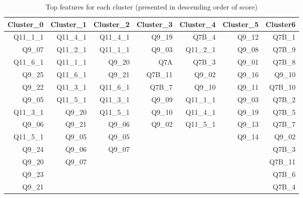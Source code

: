 \documentclass{article}
\begin{document}
\begin{table}[htbp]
  \centering
  \caption{Top features for each cluster (presented in descending order of
  score)}
    \begin{tabular}{rrrrrrr}
    \toprule
    Cluster\_0 & Cluster\_1 & Cluster\_2 & Cluster\_3 & Cluster\_4 & Cluster\_5 & Cluster6 \\
    \midrule
    Q11\_1\_1 & Q11\_4\_1 & Q11\_4\_1 & Q9\_19 & Q7B\_4 & Q9\_12 & Q7B\_1 \\
    Q9\_07 & Q11\_2\_1 & Q11\_1\_1 & Q9\_03 & Q11\_2\_1 & Q9\_08 & Q7B\_9 \\
    Q11\_6\_1 & Q11\_1\_1 & Q9\_20 & Q7A   & Q7B\_3 & Q9\_01 & Q7B\_8 \\
    Q9\_25 & Q11\_6\_1 & Q9\_21 & Q7B\_11 & Q9\_02 & Q9\_16 & Q9\_10 \\
    Q9\_22 & Q11\_3\_1 & Q11\_6\_1 & Q7B\_7 & Q9\_10 & Q9\_11 & Q7B\_10 \\
    Q9\_05 & Q11\_5\_1 & Q11\_3\_1 & Q9\_09 & Q11\_1\_1 & Q9\_03 & Q7B\_2 \\
    Q11\_3\_1 & Q9\_20 & Q11\_5\_1 & Q9\_10 & Q11\_4\_1 & Q9\_19 & Q7B\_5 \\
    Q9\_06 & Q9\_21 & Q9\_06 & Q9\_02 & Q11\_5\_1 & Q9\_13 & Q7B\_7 \\
    Q11\_5\_1 & Q9\_05 & Q9\_05 &       &       & Q9\_14 & Q9\_02 \\
    Q9\_24 & Q9\_06 & Q9\_07 &       &       &       & Q7B\_3 \\
    Q9\_20 & Q9\_07 &       &       &       &       & Q7B\_11 \\
    Q9\_23 &       &       &       &       &       & Q7B\_6 \\
    Q9\_21 &       &       &       &       &       & Q7B\_4 \\
    \bottomrule
    \end{tabular}
  \label{tab:top}
\end{table}
\end{document}

